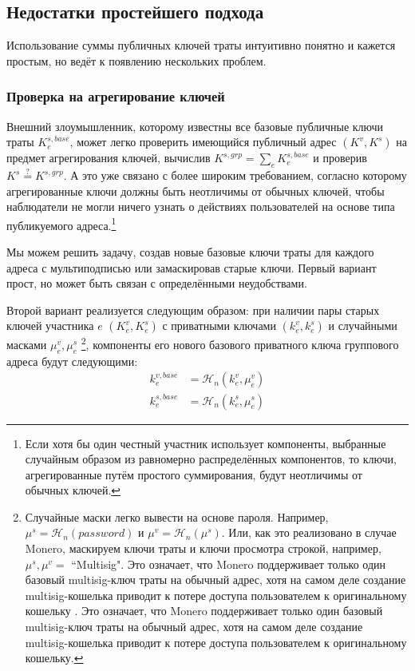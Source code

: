 \subsection{Недостатки простейшего подхода}
\label{subsec:drawbacks-naive-aggregation-cancellation}

Использование суммы публичных ключей траты интуитивно понятно и кажется простым, но ведёт к появлению нескольких проблем.

\subsubsection*{Проверка на агрегирование ключей}
Внешний злоумышленник, которому известны все базовые публичные ключи траты $K^{s,base}_e$, может легко проверить имеющийся публичный адрес $(K^v,K^s)$ на предмет агрегирования ключей, вычислив $K^{s,grp} = \sum_e K^{s,base}_e$ и проверив $K^s \stackrel{?}{=} K^{s,grp}$. А это уже связано с более широким требованием, согласно которому агрегированные ключи должны быть неотличимы от обычных ключей, чтобы наблюдатели не могли ничего узнать о действиях пользователей на основе типа публикуемого адреса.\footnote{Если хотя бы один честный участник использует компоненты, выбранные случайным образом из равномерно распределённых компонентов, то ключи, агрегированные путём простого суммирования, будут неотличимы \cite{SCOZZAFAVA1993313} от обычных ключей.}%

Мы можем решить задачу, создав новые базовые ключи траты для каждого адреса с мульти\-подписью или замаскировав старые ключи. Первый вариант прост, но может быть связан с определёнными неудобствами.

Второй вариант реализуется следующим образом: при наличии пары старых ключей участ\-ника $e$ $(K^v_e,K^s_e)$ с приватными ключами $(k^v_e,k^s_e)$ и случайными масками $\mu^v_e,\mu^s_e$ \footnote{Случайные маски легко вывести на основе пароля. Например, $\mu^s = \mathcal{H}_n(password)$ и $\mu^v = \mathcal{H}_n(\mu^s)$. Или, как это реализовано в случае Monero, маскируем ключи траты и ключи просмотра строкой, например, $\mu^s,\mu^v =$ ``Multisig". Это означает, что Monero поддерживает только один базовый multisig-ключ траты на обычный адрес, хотя на самом деле создание multisig-кошелька приводит к потере доступа пользователем к оригинальному кошельку \cite{cli-22multisig-instructions}. Это означает, что Monero поддерживает только один базовый multisig-ключ траты на обычный адрес, хотя на самом деле создание multisig-кошелька приводит к потере доступа пользователем к оригинальному кошельку.}, компоненты его нового базового приватного ключа группового адреса будут следующими:
\begin{align*}
    k^{v,base}_e &= \mathcal{H}_n(k^v_e,\mu^v_e)\\
    k^{s,base}_e &= \mathcal{H}_n(k^s_e,\mu^s_e)
\end{align*}

